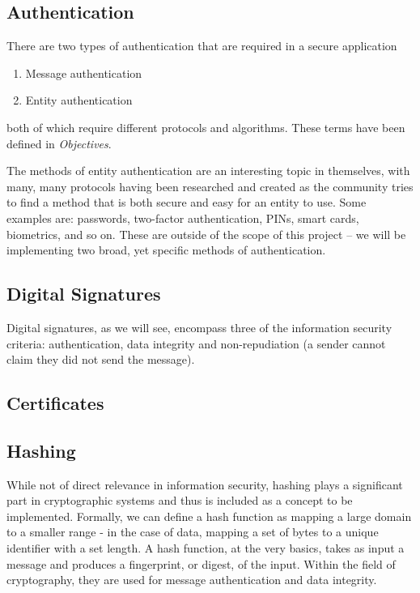 \subsection{Authentication}

There are two types of authentication that are required in a secure application

\begin{enumerate}
	\item Message authentication
	\item Entity authentication
\end{enumerate}

both of which require different protocols and algorithms. These terms have been defined in \emph{Objectives}.

The methods of entity authentication are an interesting topic in themselves, with many, many protocols having been researched and created as the community tries to find a method that is both secure and easy for an entity to use. Some examples are: passwords, two-factor authentication, PINs, smart cards, biometrics, and so on. These are outside of the scope of this project -- we will be implementing two broad, yet specific methods of authentication.

\subsection{Digital Signatures}

Digital signatures, as we will see, encompass three of the information security criteria: authentication, data integrity and non-repudiation (a sender cannot claim they did not send the message).

\subsection{Certificates}



\subsection{Hashing}

While not of direct relevance in information security, hashing plays a significant part in cryptographic systems and thus is included as a concept to be implemented. Formally, we can define a hash function as mapping a large domain to a smaller range - in the case of data, mapping a set of bytes to a unique identifier with a set length. A hash function, at the very basics, takes as input a message and produces a fingerprint, or digest, of the input. Within the field of cryptography, they are used for message authentication and data integrity.

